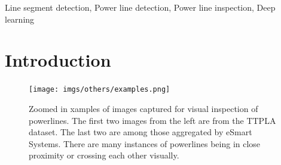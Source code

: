 \documentclass[journal]{IEEEtran}
\begin{document}
\begin{IEEEkeywords}
Line segment detection, Power line detection, Power line inspection, Deep learning
\end{IEEEkeywords}






%
\IEEEpeerreviewmaketitle



\section{Introduction}

\begin{figure}[hbt!]
  \texttt{[image: imgs/others/examples.png]}
  \caption{Zoomed in xamples of images captured for visual inspection of powerlines. The first two images from the left are from the TTPLA dataset. The last two are among those aggregated by eSmart Systems. There are many instances of powerlines being in close proximity or crossing each other visually.}
  \label{crossing_examples}
\end{figure}

% 
% 
% 
% 
\end{document}
